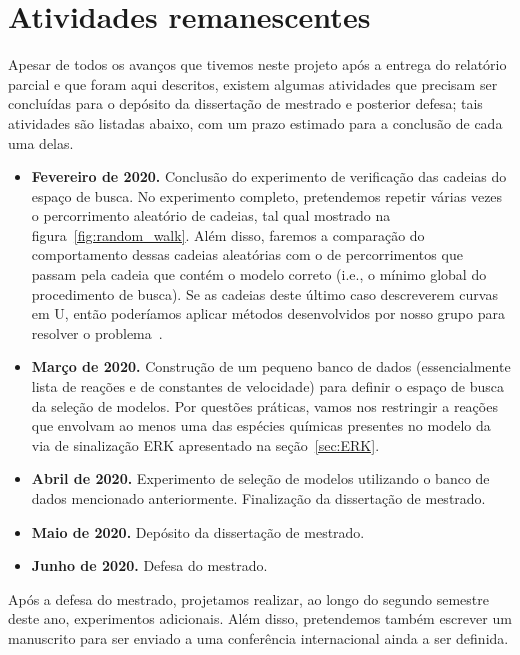 \documentclass[12pt]{article}
\begin{document}
\section{Atividades remanescentes}

Apesar de todos os avanços que tivemos neste projeto após a entrega do relatório parcial e que foram aqui descritos, existem algumas atividades que precisam ser concluídas para o depósito da dissertação de mestrado e posterior defesa; tais atividades são listadas abaixo, com um prazo estimado para a conclusão de cada uma delas.

\begin{itemize}

\item[]{\bf Fevereiro de 2020.} Conclusão do experimento de verificação das cadeias do espaço de busca. No experimento completo, pretendemos repetir várias vezes o percorrimento aleatório de cadeias, tal qual mostrado na figura~\ref{fig:random_walk}. Além disso, faremos a comparação do comportamento dessas cadeias aleatórias com o de percorrimentos que passam pela cadeia que contém o modelo correto (i.e., o mínimo global do procedimento de busca). Se as cadeias deste último caso descreverem curvas em U, então poderíamos aplicar métodos desenvolvidos por nosso grupo para resolver o problema~\cite{Reis2017featsel,Reis:2019}.

\item[]{\bf Março de 2020.} Construção de um pequeno banco de dados (essencialmente lista de reações e de constantes de velocidade) para definir o espaço de busca da seleção de modelos. Por questões práticas, vamos nos restringir a reações que envolvam ao menos uma das espécies químicas presentes no modelo da via de sinalização ERK apresentado na seção~\ref{sec:ERK}.

\item[]{\bf Abril de 2020.} Experimento de seleção de modelos utilizando o banco de dados mencionado anteriormente. Finalização da dissertação de mestrado.

\item[]{\bf Maio de 2020.} Depósito da dissertação de mestrado.

\item[]{\bf Junho de 2020.} Defesa do mestrado.

\end{itemize}

Após a defesa do mestrado, projetamos realizar, ao longo do segundo semestre deste ano, experimentos adicionais. Além disso, pretendemos também escrever um manuscrito para ser enviado a uma conferência internacional ainda a ser definida.

 

\end{document}
